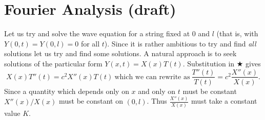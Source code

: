 \chapter{Fourier Analysis (draft)}

%

Let us try and solve the wave equation for a string
fixed at $0$ and $l$ (that is, with $Y(0,t)=Y(0,l)=0$
for all $t$). Since it is rather ambitious to try
and find \emph{all} solutions let us try and find some
solutions. A natural approach is to seek solutions
of the particular form $Y(x,t)=X(x)T(t)$. Substitution
in $\bigstar$ gives
\[X(x)T''(t)=c^{2}X''(x)T(t)
\ \text{which we can rewrite as}
\ \frac{T''(t)}{T(t)}=c^{2}\frac{X''(x)}{X(x)}.\]
Since a quantity which depends only on $x$ and
only on $t$ must be constant $X''(x)/X(x)$
must be constant on $(0,l)$. Thus
$\frac{X''(x)}{X(x)}$ must take a constant value $K$.

